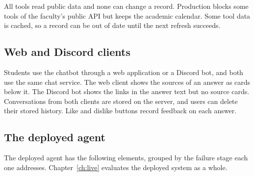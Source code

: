 All tools read public data and none can change a record. Production blocks some tools of the faculty's public API but keeps the academic calendar. Some tool data is cached, so a record can be out of date until the next refresh succeeds.

\subsection{Web and Discord clients}

Students use the chatbot through a web application or a Discord bot, and both use the same chat service. The web client shows the sources of an answer as cards below it. The Discord bot shows the links in the answer text but no source cards. Conversations from both clients are stored on the server, and users can delete their stored history. Like and dislike buttons record feedback on each answer.

\subsection{The deployed agent}
\label{sec:post-evaluation-changes}

The deployed agent has the following elements, grouped by the failure stage each one addresses. Chapter~\ref{ch:live} evaluates the deployed system as a whole.

